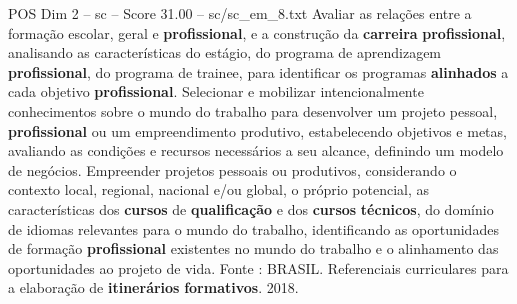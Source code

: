 \begin{textsample}{POS Dim 2 – sc – Score 31.00 – sc/sc\_em\_8.txt}
Avaliar as relações entre a formação escolar, geral e \textbf{profissional}, e a construção da \textbf{carreira} \textbf{profissional}, analisando as características do estágio, do programa de aprendizagem \textbf{profissional}, do programa de trainee, para identificar os programas \textbf{alinhados} a cada objetivo \textbf{profissional}.
Selecionar e mobilizar intencionalmente conhecimentos sobre o mundo do trabalho para desenvolver um projeto pessoal, \textbf{profissional} ou um empreendimento produtivo, estabelecendo objetivos e metas, avaliando as condições e recursos necessários a seu alcance, definindo um modelo de negócios.
Empreender projetos pessoais ou produtivos, considerando o contexto local, regional, nacional e/ou global, o próprio potencial, as características dos \textbf{cursos} de \textbf{qualificação} e dos \textbf{cursos} \textbf{técnicos}, do domínio de idiomas relevantes para o mundo do trabalho, identificando as oportunidades de formação \textbf{profissional} existentes no mundo do trabalho e o alinhamento das oportunidades ao projeto de vida.
Fonte : BRASIL.
Referenciais curriculares para a elaboração de \textbf{itinerários} \textbf{formativos}. 2018.

\end{textsample}
